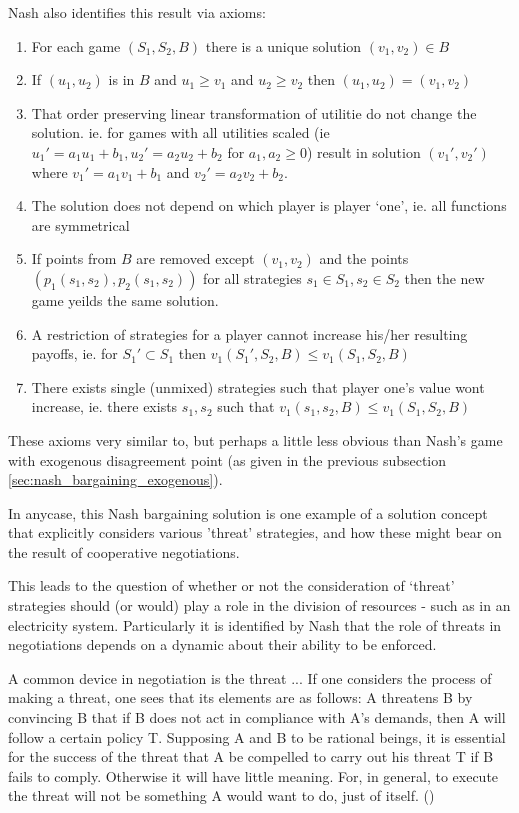 Nash also identifies this result via axioms:
\begin{enumerate}
\item For each game $(S_1,S_2,B)$ there is a unique solution $(v_1,v_2) \in B$
\item If $(u_1,u_2)$ is in $B$ and $u_1\ge v_1$ and $u_2\ge v_2$ then $(u_1,u_2)=(v_1,v_2)$
\item That order preserving linear transformation of utilitie do not change the solution. ie. for games with all utilities scaled (ie $u_1' = a_1u_1+b_1, u_2' = a_2u_2+b_2$ for $a_1,a_2\ge 0$) result in solution $(v_1',v_2')$ where $v_1'=a_1v_1+b_1$ and $v_2'=a_2v_2+b_2$.
\item The solution does not depend on which player is player `one', ie. all functions are symmetrical
\item If points from $B$ are removed except $(v_1,v_2)$ and the points $(p_1(s_1,s_2), p_2(s_1,s_2))$ for all strategies $s_1\in S_1,s_2\in S_2$ then the new game yeilds the same solution.
\item A restriction of strategies for a player cannot increase his/her resulting payoffs, ie. for $S_1'\subset S_1$ then $v_1(S_1',S_2,B)\le v_1(S_1,S_2,B)$
\item There exists single (unmixed) strategies such that player one's value wont increase, ie. there exists $s_1,s_2$ such that $v_1(s_1,s_2,B)\le v_1(S_1,S_2,B)$
\end{enumerate}

These axioms very similar to, but perhaps a little less obvious than Nash's game with exogenous disagreement point (as given in the previous subsection \ref{sec:nash_bargaining_exogenous}).

In anycase, this Nash bargaining solution is one example of a solution concept that explicitly considers various 'threat' strategies, and how these might bear on the result of cooperative negotiations.

This leads to the question of whether or not the consideration of `threat' strategies should (or would) play a role in the division of resources - such as in an electricity system.
Particularly it is identified by Nash that the role of threats in negotiations depends on a dynamic about their ability to be enforced.

\begin{displayquote}
A common device in negotiation is the threat ... If one considers the process of making a threat, one sees that its elements are as follows: A threatens B by convincing B that if B does not act in compliance with A's demands, then A will follow a certain policy T. Supposing A and B to be rational beings, it is essential for the success of the threat that A be compelled to carry out his threat T if B fails to comply. Otherwise it will have little meaning. For, in general, to execute the threat will not be something A would want to do, just of itself.
(\cite{nash2})
\end{displayquote}


